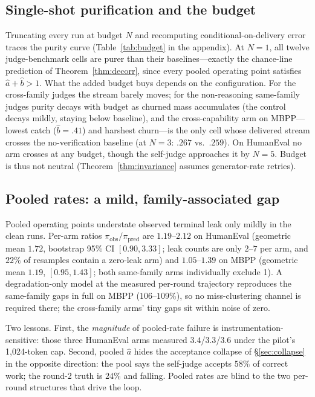 \documentclass[10pt]{article}
\begin{document}
\subsection{Single-shot purification and the budget}
\label{sec:budget}
Truncating every run at budget $N$ and recomputing
conditional-on-delivery error traces the purity curve
(Table~\ref{tab:budget} in the appendix).  At $N{=}1$, all twelve
judge-benchmark
cells are purer than their baselines---exactly the chance-line
prediction of Theorem~\ref{thm:decorr}, since every pooled
operating point satisfies $\hat a + \hat b > 1$.  What the added
budget buys depends on the configuration.  For the cross-family
judges the stream barely moves; for the non-reasoning same-family
judges purity decays with budget as churned mass accumulates
(the control decays mildly, staying below baseline), and the
cross-capability arm on MBPP---lowest catch ($\hat b = .41$) and
harshest churn---is the only cell whose delivered stream crosses
the no-verification baseline (at $N{=}3$: $.267$ vs.\ $.259$).  On
HumanEval no arm crosses at any budget, though the self-judge
approaches it by $N{=}5$.  Budget
is thus not neutral (Theorem~\ref{thm:invariance} assumes
generator-rate retries).

\subsection{Pooled rates: a mild, family-associated gap}
\label{sec:pooled}
Pooled operating points understate observed terminal leak only
mildly in the clean runs.  Per-arm ratios
$\pi_{\mathrm{obs}}/\pi_{\mathrm{pred}}$ are $1.19$--$2.12$ on
HumanEval (geometric mean $1.72$, bootstrap 95\% CI
$[0.90, 3.33]$; leak counts are only $2$--$7$ per arm, and $22\%$
of resamples contain a zero-leak arm) and $1.05$--$1.39$ on MBPP
(geometric mean $1.19$, $[0.95, 1.43]$; both same-family arms
individually exclude 1).  A degradation-only model at
the measured per-round trajectory reproduces the same-family gaps
in full on MBPP ($106$--$109\%$), so no miss-clustering channel
is required there; the cross-family arms' tiny gaps sit within
noise of zero.

Two lessons.  First, the \emph{magnitude} of pooled-rate failure
is instrumentation-sensitive: those three HumanEval arms measured
$3.4$/$3.3$/$3.6$ under the pilot's 1{,}024-token cap.  Second,
pooled $\hat a$
hides the acceptance collapse of §\ref{sec:collapse} in the
opposite direction: the pool says the self-judge accepts $58\%$
of correct work; the round-2 truth is $24\%$ and falling.  Pooled
rates are blind to the two per-round structures that drive the
loop.
\end{document}
